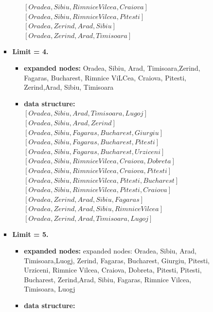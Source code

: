 \documentclass{article}%
\begin{document}
\begin{enumerate}
\begin{enumerate}
\begin{itemize}
\begin{itemize}
			$ \left[ Oradea, Sibiu, Rimnice Vilcea, Craiova \right]$\\
			$\left[ Oradea, Sibiu, Rimnice Vilcea, Pitesti \right]$ \\
			$ \left[ Oradea, Zerind, Arad, Sibiu\right]$ \\ 
			$\left[ Oradea, Zerind, Arad, Timisoara\right] $ 
			\end{itemize}
		\item \textbf{Limit = 4.} 
			\begin{itemize}
			\item \textbf{expanded nodes:} Oradea, Sibiu, Arad, Timisoara,Zerind, Fagaras, Bucharest, Rimnice ViLCea, Craiova, Pitesti, Zerind,Arad, Sibiu, Timisoara 
			\item \textbf{data structure:} \\
			$\left[ Oradea, Sibiu, Arad,Timisoara, Lugoj \right]$ \\ 
		    $\left[ Oradea, Sibiu, Arad,Zerind \right]$ \\ 
			$ \left[ Oradea, Sibiu, Fagaras, Bucharest, Giurgiu \right]$ \\ 
			$\left[ Oradea, Sibiu, Fagaras, Bucharest, Pitesti \right]$ \\ 
			$ \left[ Oradea, Sibiu, Fagaras, Bucharest, Urziceni \right]$ \\
			$ \left[ Oradea, Sibiu, Rimnice Vilcea, Craiova,Dobreta \right]$ \\ 
			$ \left[ Oradea, Sibiu, Rimnice Vilcea, Craiova,Pitesti \right]$ \\ 
			$\left[ Oradea, Sibiu, Rimnice Vilcea, Pitesti, Bucharest \right] $ \\
			$\left[ Oradea, Sibiu, Rimnice Vilcea, Pitesti, Craiova \right]$ \\
			$ \left[ Oradea, Zerind, Arad, Sibiu, Fagaras\right]$ \\ 
			$\left[ Oradea, Zerind, Arad, Sibiu, Rimnice Vilcea\right]$ \\
			$\left[ Oradea, Zerind, Arad, Timisoara, Lugoj\right] $ 
			\end{itemize}
		\item \textbf{Limit = 5.} 
			\begin{itemize}
			\item \textbf{expanded nodes:} expanded nodes: Oradea, Sibiu, Arad, Timisoara,Luogj,
Zerind, Fagaras, Bucharest, Giurgiu, Pitesti, Urziceni, Rimnice Vilcea, Craiova, Dobreta, Pitesti, Pitesti, Bucharest, Zerind,Arad, Sibiu, Fagaras, Rimnice Vilcea, Timisoara, Luogj
			\item \textbf{data structure:} \\

\end{itemize}
\end{itemize}
\end{enumerate}
\end{enumerate}
\end{document}
